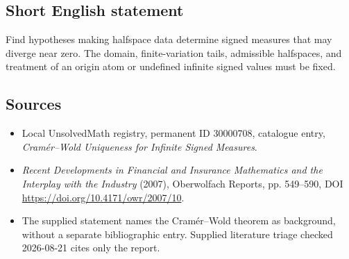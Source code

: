 \documentclass[11pt]{article}
\begin{document}
\subsection{Short English statement}
Find hypotheses making halfspace data determine signed measures that may diverge near zero. The domain, finite-variation tails, admissible halfspaces, and treatment of an origin atom or undefined infinite signed values must be fixed.
\subsection{Sources}
\begin{itemize}
\item Local UnsolvedMath registry, permanent ID 30000708, catalogue entry, \emph{Cram\'er--Wold Uniqueness for Infinite Signed Measures}.
\item \emph{Recent Developments in Financial and Insurance Mathematics and the Interplay with the Industry} (2007), Oberwolfach Reports, pp. 549--590, DOI \url{https://doi.org/10.4171/owr/2007/10}.
\item The supplied statement names the Cram\'er--Wold theorem as background, without a separate bibliographic entry. Supplied literature triage checked 2026-08-21 cites only the report.
\end{itemize}
\end{document}
